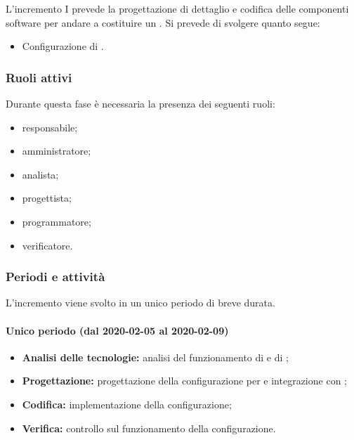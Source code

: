 			L'incremento I prevede la progettazione di dettaglio e codifica delle componenti software per andare a costituire un . Si prevede di svolgere quanto segue:
			\begin{itemize}
				\item Configurazione di .
			\end{itemize}
			
			\subsubsection{Ruoli attivi}
			
				Durante questa fase è necessaria la presenza dei seguenti ruoli:
				\begin{itemize}
					\item responsabile;
					\item amministratore;
					\item analista;
					\item progettista;
					\item programmatore;
					\item verificatore.
				\end{itemize}
			
			\subsubsection{Periodi e attività}
			
				L'incremento viene svolto in un unico periodo di breve durata.
				
				\paragraph{Unico periodo (dal 2020-02-05 al 2020-02-09)}
				
					\begin{itemize}
						\item \textbf{Analisi delle tecnologie:} analisi del funzionamento di  e di ;
						\item \textbf{Progettazione:} progettazione della configurazione per  e integrazione con ;
						\item \textbf{Codifica:} implementazione della configurazione;
						\item \textbf{Verifica:} controllo sul funzionamento della configurazione.
					\end{itemize} 			

